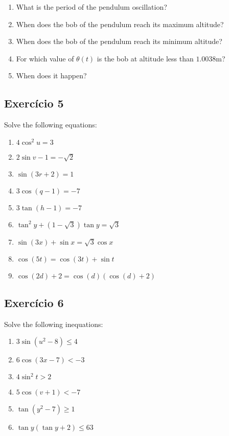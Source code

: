 \begin{enumerate}
\item What is the period of the pendulum oscillation?
\item When does the bob of the pendulum reach its maximum altitude?
\item When does the bob of the pendulum reach its minimum altitude?
\item For which value of $\theta(t)$ is the bob at altitude less
  than $1.0038 \text{m}$?
\item When does it happen?
\end{enumerate}

\subsection*{Exercício 5}

Solve the following equations:

\begin{enumerate}
\item $4 \cos^2{u} = 3$
\item $2\sin{v-1} = -\sqrt{2}$
\item $\sin{(3r+2)} = 1$
\item $3 \cos{(q-1)} = -7$
\item $3 \tan{(h-1)} = -7$
\item $\tan^2{y} + {(1-\sqrt{3})} \tan{y} = \sqrt{3}$
\item $\sin{(3x)} +  \sin x = \sqrt{3} \cos{x}$
\item $\cos{(5t)} = \cos{(3t)}  + \sin{t}$
\item $\cos{(2d)} + 2 = \cos{(d)} \left(\cos{(d)} + 2\right)$
\end{enumerate}

\subsection*{Exercício 6}

Solve the following inequations:

\begin{enumerate}
  \item $3 \sin{(u^2-8)} \leq 4$
  \item $6 \cos{(3x - 7)} < -3$
  \item $4 \sin^{2}{t} > 2$
  \item $5 \cos{(v+1)} < -7$
  \item $\tan{(y^2-7)} \geq 1$
  \item $\tan{y}\left(\tan{y} + 2\right) \leq 63$
\end{enumerate}

